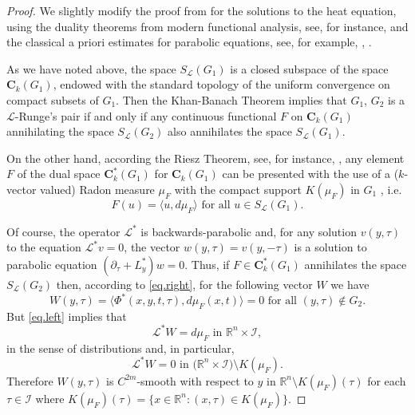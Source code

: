 \documentclass{amsart}
\theoremstyle{definition}
\theoremstyle{remark}
\numberwithin{equation}{section}
\begin{document}
\begin{proof} We slightly modify  the proof from \cite{D80} for the solutions  
to the heat equation, using the duality theorems from modern functional analysis, 
see, for instance, \cite{Edw65} and the classical a priori estimates for parabolic equations, 
see, for example, \cite{eid}, \cite{frid}.  

As we have noted above, the space $S_{\mathcal L}(G_1)$ is a closed subspace of the space 
${\mathbf C}_k (G_1)$, endowed with the standard topology of the uniform convergence 
on compact subsets of  $G_1$. Then the Khan-Banach Theorem implies that $G_1$, $G_2$ is a 
${\mathcal L}$-Runge's pair if and only if any continuous functional $F$ on ${\mathbf C}_k 
(G_1)$ annihilating the space $S_{\mathcal L}(G_2)$ also annihilates the space 
$S_{\mathcal L}(G_1)$.

On the other hand, according the Riesz Theorem, see, for instance, 
\cite[Theorem 4.10.1]{Edw65}, any element $F$ of the dual space ${\mathbf 
C}_k^* (G_1)$ for ${\mathbf C}_k (G_1)$
can be presented with the use of a ($k$-vector valued) Radon measure $\mu_F$ with 
the compact support $K(\mu_F)$ in $G_1$ , i.e.
\begin{equation} \label{eq.Riesz}
F(u) = %
\langle u ,d\mu_F  
\rangle \mbox{ for all } u \in S_{\mathcal L}(G_1).
\end{equation}

Of course, the operator ${\mathcal L}^*$ is backwards-parabolic and, for any 
solution $v(y,\tau)$ to the equation ${\mathcal L}^* v =0$, the vector 
$w(y,\tau)=v(y,-\tau)$  is a solution to parabolic equation 
$(\partial_\tau + L^* _y) w =0$. Thus, if $F\in {\mathbf C}_k^* (G_1)$ annihilates the space $S_{\mathcal L}(G_2)$ then, according to  
\eqref{eq.right}, for the following vector $W$ we have  
\begin{equation}
\label{eq.v1.A}
W(y,\tau)= %
\langle \Phi^* (x,y, t,\tau) , d\mu _F (x,t) \rangle=  0 \mbox{ for all } 
(y,\tau) \not \in G_2.
\end{equation}
But \eqref{eq.left} implies that 
\begin{equation} \label{eq.L*W.1}
{\mathcal L}^* W = d\mu_F \mbox{ in } {\mathbb R}^{n} \times \mathcal{I},  
\end{equation}
in the sense of distributions and, in particular, 
\begin{equation} \label{eq.L*W.2}
{\mathcal L}^* W = 0 \mbox{ in } %
\Big({\mathbb R}^{n} \times \mathcal{I} \Big) \setminus K(\mu_F).
\end{equation}
Therefore $W(y,\tau)$ is $C^{2m}$-smooth with respect to  $y$ in ${\mathbb R}^n 
\setminus K(\mu_F) (\tau)$ for each $\tau \in \mathcal{I}$ where 
$K(\mu_F) (\tau) = \{x\in {\mathbb R}^n: (x,\tau) \in K(\mu_F)\}$. 


\end{proof}
\end{document}
